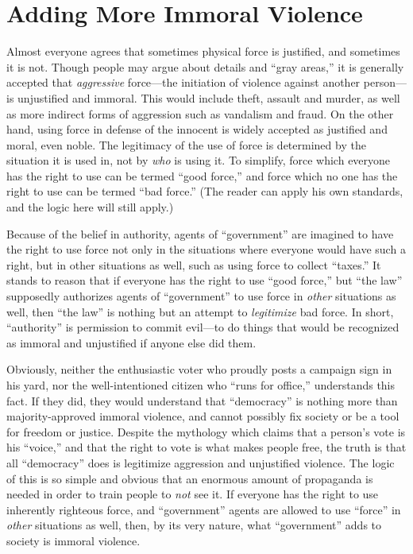 \documentclass{book}
\begin{document}
\section{Adding More Immoral Violence}

Almost everyone agrees that sometimes physical force is justified, and sometimes it is not. Though people may argue about details and \enquote{gray areas,} it is generally accepted that \emph{aggressive} force---the initiation of violence against another person---is unjustified and immoral. This would include theft, assault and murder, as well as more indirect forms of aggression such as vandalism and fraud. On the other hand, using force in defense of the innocent is widely accepted as justified and moral, even noble. The legitimacy of the use of force is determined by the situation it is used in, not by \emph{who} is using it. To simplify, force which everyone has the right to use can be termed \enquote{good force,} and force which no one has the right to use can be termed \enquote{bad force.} (The reader can apply his own standards, and the logic here will still apply.)

Because of the belief in authority, agents of \enquote{government} are imagined to have the right to use force not only in the situations where everyone would have such a right, but in other situations as well, such as using force to collect \enquote{taxes.} It stands to reason that if everyone has the right to use \enquote{good force,} but \enquote{the law} supposedly authorizes agents of \enquote{government} to use force in \emph{other} situations as well, then \enquote{the law} is nothing but an attempt to \emph{legitimize} bad force. In short, \enquote{authority} is permission to commit evil---to do things that would be recognized as immoral and unjustified if anyone else did them.

Obviously, neither the enthusiastic voter who proudly posts a campaign sign in his yard, nor the well-intentioned citizen who \enquote{runs for office,} understands this fact. If they did, they would understand that \enquote{democracy} is nothing more than majority-approved immoral violence, and cannot possibly fix society or be a tool for freedom or justice. Despite the mythology which claims that a person's vote is his \enquote{voice,} and that the right to vote is what makes people free, the truth is that all \enquote{democracy} does is legitimize aggression and unjustified violence. The logic of this is so simple and obvious that an enormous amount of propaganda is needed in order to train people to \emph{not} see it. If everyone has the right to use inherently righteous force, and \enquote{government} agents are allowed to use \enquote{force} in \emph{other} situations as well, then, by its very nature, what \enquote{government} adds to society is immoral violence.
\end{document}
